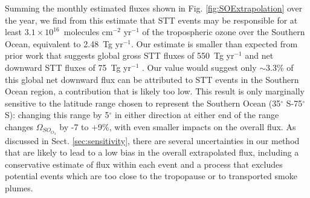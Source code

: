   Summing the monthly estimated fluxes shown in Fig. \ref{fig:SOExtrapolation} over the year, we find from this estimate that STT events may be responsible for at least $3.1 \times10^{16}$~molecules cm$^{-2}$ yr$^{-1}$ of the tropospheric ozone over the Southern Ocean, equivalent to 2.48~Tg yr$^{-1}$.
  Our estimate is smaller than expected from prior work that suggests global gross STT fluxes of 550~Tg yr$^{-1}$ \citep{Stevenson2006} and net downward STT fluxes of 75~Tg yr$^{-1}$ \citep{Sprenger2003}.
  Our value would suggest only $\sim$3.3\% of this global net downward flux can be attributed to STT events in the Southern Ocean region, a contribution that is likely too low.
  This result is only marginally sensitive to the latitude range chosen to represent the Southern Ocean (35$^{\circ}$ S-75$^{\circ}$ S): changing this range by 5$^{\circ}$ in either direction at either end of the range changes $\Omega_{SO_{O_3}}$ by -7 to +9\%, with even smaller impacts on the overall flux.
  As discussed in Sect. \ref{sec:sensitivity}, there are several uncertainties in our method that are likely to lead to a low bias in the overall extrapolated flux, including a conservative estimate of flux within each event and a process that excludes potential events which are too close to the tropopause or to transported smoke plumes.

  
  
